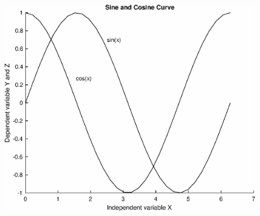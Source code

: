 \documentclass[12pt,a4paper]{article}
\begin{document}
\begin{center}
	\begin{figure}[H]
	\begin{center}
		\includegraphics[scale=0.6]{hinhtieuluan/dothi7}
	\end{center}
		\caption{}
		\label{refdothi7}
	\end{figure}
\end{center}
\end{document}

